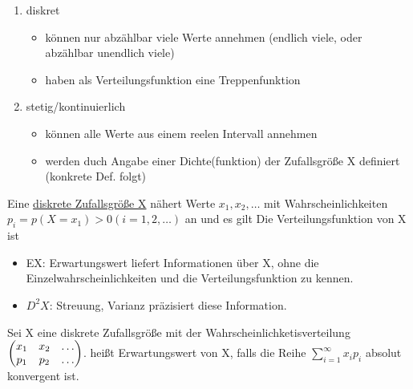 \documentclass{../tudscript}
\begin{document}
\begin{enumerate}
\item diskret
\begin{itemize}
\item können nur abzählbar viele Werte annehmen (endlich viele, oder abzählbar unendlich viele)
\item haben als Verteilungsfunktion eine Treppenfunktion
\end{itemize}
\item stetig/kontinuierlich
\begin{itemize}
\item können alle Werte aus einem reelen Intervall annehmen
\item werden duch Angabe einer Dichte(funktion) der Zufallsgröße X definiert (konkrete Def. folgt)
\end{itemize}
\end{enumerate}

Eine \underline{diskrete Zufallsgröße X} nähert Werte $x_1, x_2, \ldots$ mit Wahrscheinlichkeiten 
$p_i = p(X = x_1) > 0 (i = 1, 2, \ldots)$ an und es gilt
Die Verteilungsfunktion von X ist

\begin{itemize}
\item EX: Erwartungswert liefert Informationen über X, ohne die Einzelwahrscheinlichkeiten und die Verteilungsfunktion zu kennen.
\item $D^2 X$: Streuung, Varianz präzisiert diese Information.
\end{itemize}

Sei X eine diskrete Zufallsgröße mit der Wahrscheinlichketisverteilung $\begin{pmatrix} x_1 & x_2 & \ldots \\ p_1 & p_2 & \ldots \end{pmatrix}$.
heißt Erwartungswert von X, falls die Reihe $\sum_{i=1}^\infty x_i p_i$ absolut konvergent ist.
\end{document}
